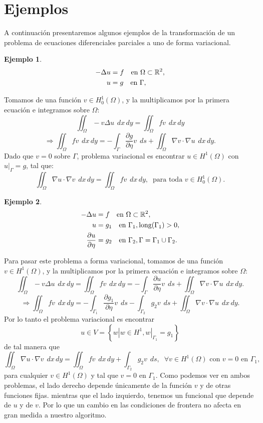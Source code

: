 \documentclass[12pt,spanish,oneside]{book}
\theoremstyle{plain}
\numberwithin{equation}{chapter}
\theoremstyle{definition}
\newtheorem{ej}{Ejemplo}[chapter]
\theoremstyle{remark}
\newcommand{\re}{\mathbb{R}}
\newcommand{\parc}[2]{\frac{\partial #1}{\partial #2}}
\newcommand{\hu}{H^1}
\newcommand{\hcu}{H_0^1}
\newcommand{\dxy}{\hspace{5pt} dx\hspace{2pt} dy }
\newcommand{\ds}{\hspace{5pt} ds}
\begin{document}
\section{Ejemplos}
A continuación presentaremos algunos ejemplos de la transformación de un problema de ecuaciones diferenciales parciales a uno de forma variacional. 
\begin{ej}
\begin{align*}
-\Delta u &= f \hspace{10 pt} \text{en } \Omega \subset \re^2 , \\
u &=g \hspace{10 pt} \text{en } \Gamma,
\end{align*}
\end{ej}
Tomamos de una función $v\in \hcu(\Omega)$, y la multiplicamos por la primera ecuación e integramos sobre $\Omega$:
\[\iint_\Omega -v\Delta u\dxy= \iint_\Omega f v \dxy\]
\[\Rightarrow \iint_\Omega f v\dxy = -\int_\Gamma \parc{g}{\eta} v \ds +\iint_\Omega\nabla v\cdot \nabla u \dxy.\]
Dado que $v=0$ sobre $\Gamma$,  problema variacional es encontrar $u\in H^1(\Omega)$ con $u|_\Gamma=g$, tal que: 
\[\iint_\Omega \nabla u \cdot\nabla v\dxy=\iint_\Omega fv\dxy , \phantom{\pi} \text{para toda } v\in\hcu(\Omega).\]


\begin{ej}
\begin{align*}
-\Delta u &= f \hspace{10 pt} \text{en } \Omega \subset \re^2 , \\
u &=g_1 \hspace{10 pt} \text{en } \Gamma_1 , \text{long}(\Gamma_1)>0,\\
\parc{u}{\eta} &=g_2 \hspace{10 pt} \text{en } \Gamma_2 , \Gamma= \Gamma_1\cup \Gamma_2.
\end{align*}
\end{ej}
Para pasar este problema a forma variacional, tomamos de una función $v\in \hu(\Omega)$, y la multiplicamos por la primera ecuación e integramos sobre $\Omega$:
\[\iint_\Omega -v\Delta u \dxy= \iint_\Omega f v \dxy=- \int_\Gamma \parc{u}{\eta}v \ds+\iint_\Omega \nabla v\cdot \nabla u \dxy.\]
\[\Rightarrow \iint_\Omega fv\dxy = -\int_{\Gamma_{1}} \parc{g_1}{\eta} v \ds -\int_{\Gamma_{2}} g_2 v \ds+\iint_\Omega\nabla v\cdot \nabla u \dxy.\]
Por lo tanto el problema variacional es encontrar $$u\in V=\left\lbrace w | w\in H^1, w|_{\Gamma_{1}}=g_1\right\rbrace $$ de tal manera que 
\[\iint_\Omega \nabla u \cdot\nabla v\dxy=\iint_\Omega fv\dxy + \int_{\Gamma_{2}} g_2 v \ds, \phantom{\pi} \forall v \in \hu(\Omega) \text{ con } v=0 \text{ en } \Gamma_1, \]
para cualquier $v\in \hu(\Omega)$ y tal que $v=0$ en $\Gamma_1$. Como podemos ver en ambos problemas, el lado derecho depende únicamente de la función $v$ y de otras funciones fijas. mientras que el lado izquierdo, tenemos un funcional que depende de $u$ y de $v$. Por lo que un cambio en las condiciones de frontera no afecta en gran medida a nuestro algoritmo.
\end{document}
